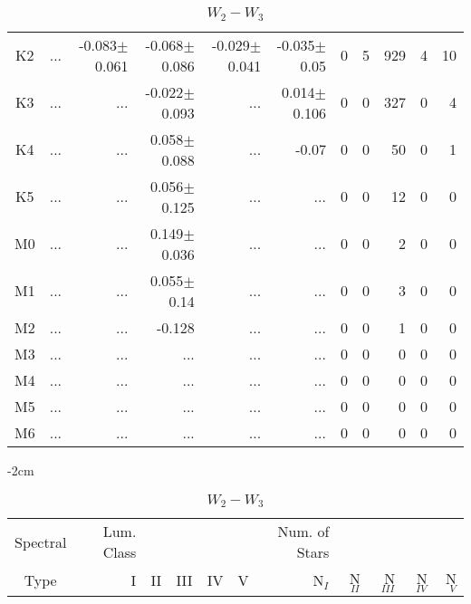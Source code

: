 \begin{table}[t]
\begin{table}[t]
\begin{center}
\begin{tabular}{c|rrrrr|rrrrr}
    K2	&	 ...	&	-0.083$\pm$0.061	&	-0.068$\pm$0.086	&	-0.029$\pm$0.041	&	-0.035$\pm$0.05	&	0	&	5	&	929	&	4	&	10	\\
    K3	&	 ...	&	 ...	&	-0.022$\pm$0.093	&	 ...	&	0.014$\pm$0.106	&	0	&	0	&	327	&	0	&	4	\\
    K4	&	 ...	&	 ...	&	0.058$\pm$0.088	&	 ...	&	-0.07	&	0	&	0	&	50	&	0	&	1	\\
    K5	&	 ...	&	 ...	&	0.056$\pm$0.125	&	 ...	&	 ...	&	0	&	0	&	12	&	0	&	0	\\
    M0	&	 ...	&	 ...	&	0.149$\pm$0.036	&	 ...	&	 ...	&	0	&	0	&	2	&	0	&	0	\\
    M1	&	 ...	&	 ...	&	0.055$\pm$0.14	&	 ...	&	 ...	&	0	&	0	&	3	&	0	&	0	\\
    M2	&	 ...	&	 ...	&	-0.128	&	 ...	&	 ...	&	0	&	0	&	1	&	0	&	0	\\
    M3	&	 ...	&	 ...	&	 ...	&	 ...	&	 ...	&	0	&	0	&	0	&	0	&	0	\\
    M4	&	 ...	&	 ...	&	 ...	&	 ...	&	 ...	&	0	&	0	&	0	&	0	&	0	\\
    M5	&	 ...	&	 ...	&	 ...	&	 ...	&	 ...	&	0	&	0	&	0	&	0	&	0	\\
    M6	&	 ...	&	 ...	&	 ...	&	 ...	&	 ...	&	0	&	0	&	0	&	0	&	0	\\
        \bottomrule
        \end{tabular}
    \end{center}
    \end{table}
    
    
    \begin{table}[t]
    \tiny
    \centering
    \caption{$W_{2}-W_{3}$}
    \begin{center}
        \addtolength{\leftskip} {-2cm}
        \addtolength{\rightskip}{-2cm}
        \begin{tabular}{c|rrrrr|rrrrr}
        \toprule
        Spectral & Lum. Class & & & & & Num. of Stars & & & &  \\
        Type & I & II & III &  IV & V & N$_{I}$ & N$_{II}$ & N$_{III}$ & N$_{IV}$ & N$_{V}$ \\ \midrule
     

\end{tabular}
\end{center}
\end{table}
\end{table}
